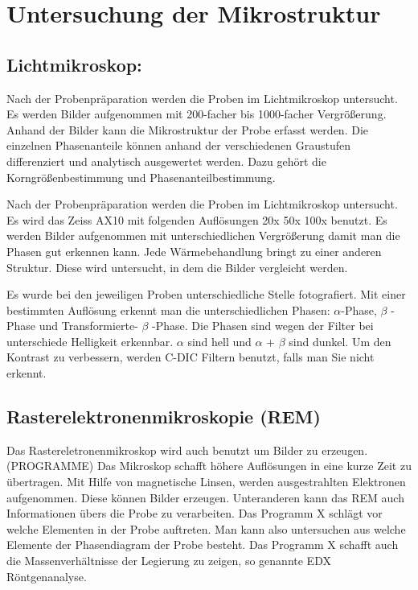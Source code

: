 \section{Untersuchung der Mikrostruktur}

\subsection{Lichtmikroskop:}
Nach der Probenpräparation werden die Proben im Lichtmikroskop untersucht. Es werden Bilder aufgenommen mit 200-facher bis 1000-facher Vergrößerung. Anhand der Bilder kann die Mikrostruktur der Probe erfasst werden. Die einzelnen Phasenanteile können anhand der verschiedenen Graustufen differenziert und analytisch ausgewertet werden. Dazu gehört die Korngrößenbestimmung und Phasenanteilbestimmung. 

	Nach der Probenpräparation werden die Proben im Lichtmikroskop untersucht. Es wird das Zeiss AX10 mit folgenden Auflösungen 20x 50x 100x benutzt. Es werden Bilder aufgenommen mit unterschiedlichen Vergrößerung damit man die Phasen gut erkennen kann. Jede Wärmebehandlung bringt zu einer anderen Struktur. Diese wird untersucht, in dem die Bilder vergleicht werden. 
	
	Es wurde bei den jeweiligen Proben unterschiedliche Stelle fotografiert. Mit einer bestimmten Auflösung erkennt man die unterschiedlichen Phasen: $\alpha$-Phase, $\beta$ -Phase und Transformierte- $\beta$ -Phase. Die Phasen sind wegen der Filter bei unterschiede Helligkeit erkennbar. $\alpha$ sind hell und $\alpha$ + $\beta$ sind dunkel. Um den Kontrast zu verbessern, werden C-DIC Filtern benutzt, falls man Sie nicht erkennt.


\subsection{Rasterelektronenmikroskopie (REM)}

	Das Rastereletronenmikroskop wird auch benutzt um Bilder zu erzeugen. (PROGRAMME) Das Mikroskop schafft höhere Auflösungen in eine kurze Zeit zu übertragen. Mit Hilfe von magnetische Linsen, werden ausgestrahlten Elektronen aufgenommen.  Diese können Bilder erzeugen. Unteranderen kann das REM auch Informationen übers die Probe zu verarbeiten. Das Programm X schlägt vor welche Elementen in der Probe auftreten. Man kann also untersuchen aus welche Elemente der Phasendiagram der Probe besteht. Das Programm X schafft auch die Massenverhältnisse der Legierung zu zeigen, so genannte EDX Röntgenanalyse.   
	
